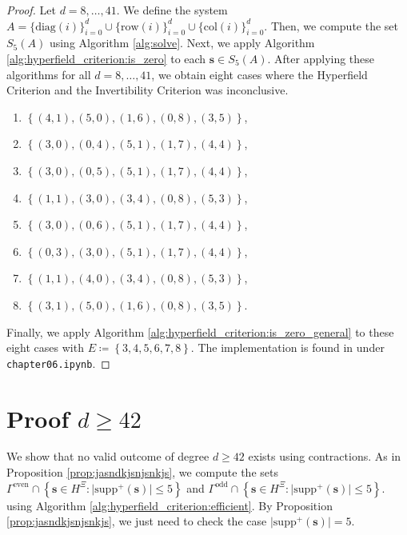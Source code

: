 \begin{proof}
    Let \( d = 8, \dots, 41 \). We define the system $A = \{ \mathrm{diag}(i) \}_{i=0}^d \cup \{ \mathrm{row}(i)\}^d_{i=0} \cup \{ \mathrm{col}(i) \}^d_{i=0}$. Then, we compute the set \( S_5(A) \) using Algorithm \ref{alg:solve}. Next, we apply Algorithm \ref{alg:hyperfield_criterion:is_zero} to each \( \mathbf{s} \in S_5(A) \). After applying these algorithms for all \( d = 8, \dots, 41 \), we obtain eight cases where the Hyperfield Criterion and the Invertibility Criterion was inconclusive.
    \begin{enumerate}
        \item \( \left\{ (4, 1), (5, 0), (1, 6), (0, 8), (3, 5) \right\} \),
        \item \( \left\{  (3, 0), (0, 4), (5, 1), (1, 7), (4, 4) \right\} \),
        \item \( \left\{  (3, 0), (0, 5), (5, 1), (1, 7), (4, 4) \right\} \),
        \item \( \left\{   (1, 1), (3, 0), (3, 4), (0, 8), (5, 3) \right\} \),
        \item \( \left\{   (3, 0), (0, 6), (5, 1), (1, 7), (4, 4) \right\} \),
        \item \( \left\{   (0, 3), (3, 0), (5, 1), (1, 7), (4, 4) \right\} \),
        \item \( \left\{  (1, 1), (4, 0), (3, 4), (0, 8), (5, 3) \right\} \),
        \item \( \left\{  (3, 1), (5, 0), (1, 6), (0, 8), (3, 5) \right\} \).
    \end{enumerate}    
    Finally, we apply Algorithm \ref{alg:hyperfield_criterion:is_zero_general} to these eight cases with \( E \coloneqq \left\{ 3,4,5,6,7,8 \right\} \). The implementation is found in \cite{ducrepo} under \texttt{chapter06.ipynb}.
\end{proof}

\section{Proof \( d \geq 42 \)}

We show that no valid outcome of degree \( d \geq 42 \) exists using contractions. As in Proposition \ref{prop:jasndkjsnjsnkjs}, we compute the sets \(  \Gamma^{\mathrm{even}} \cap \left\{ \mathbf{s} \in H^{\Xi} : \lvert \mathrm{supp}^+(\mathbf{s}) \rvert \leq 5 \right\} \) and \( \Gamma^{\mathrm{odd}} \cap \left\{ \mathbf{s} \in H^{\Xi} : \lvert \mathrm{supp}^+(\mathbf{s}) \rvert \leq 5 \right\}  \).
using Algorithm \ref{alg:hyperfield_criterion:efficient}. By Proposition \ref{prop:jasndkjsnjsnkjs}, we just need to check the case \( \lvert \mathrm{supp}^+(\mathbf{s}) \rvert = 5 \).



